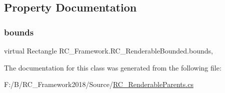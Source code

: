 \subsection{Property Documentation}
\mbox{\label{class_r_c___framework_1_1_r_c___renderable_bounded_a64a3cd64146d7e7bc5897e5a849f158f}} 
\subsubsection{\texorpdfstring{bounds}{bounds}}
{\footnotesize\ttfamily virtual Rectangle R\+C\+\_\+\+Framework.\+R\+C\+\_\+\+Renderable\+Bounded.\+bounds\hspace{0.3cm}{\ttfamily [get]}, {\ttfamily [set]}}



The documentation for this class was generated from the following file\+:\begin{DoxyCompactItemize}
\item 
F\+:/\+B/\+R\+C\+\_\+\+Framework2018/\+Source/\mbox{\hyperlink{_r_c___renderable_parents_8cs}{R\+C\+\_\+\+Renderable\+Parents.\+cs}}\end{DoxyCompactItemize}
